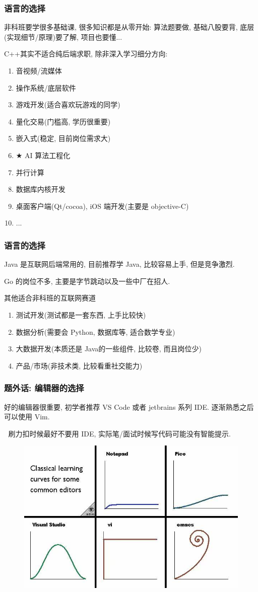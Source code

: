 \documentclass{ctexbeamer}
\begin{document}
\begin{frame}
	\frametitle{语言的选择}

	非科班要学很多基础课, 很多知识都是从零开始: 算法题要做, 基础八股要背, 底层(实现细节/原理)要了解, 项目也要懂...

	C++其实不适合纯后端求职, 除非深入学习细分方向:
	\begin{enumerate}
		\item 音视频/流媒体
		\item 操作系统/底层软件
		\item 游戏开发(适合喜欢玩游戏的同学)
		\item 量化交易(门槛高, 学历很重要)
		\item 嵌入式(稳定, 目前岗位需求大)
		\item $\bigstar$ AI 算法工程化
		\item 并行计算
		\item 数据库内核开发
		\item 桌面客户端(Qt/cocoa), iOS 端开发(主要是 objective-C)
		\item ...
	\end{enumerate}
\end{frame}
\begin{frame}
	\frametitle{语言的选择}
	Java 是互联网后端常用的, 目前推荐学 Java, 比较容易上手, 但是竞争激烈.

	Go 的岗位不多, 主要是字节跳动以及一些中厂在招人.

	\begin{exampleblock}{其他适合非科班的互联网赛道}
		\begin{enumerate}
			\item 测试开发(测试都是一套东西, 上手比较快)
			\item 数据分析(需要会 Python, 数据库等, 适合数学专业)
			\item 大数据开发(本质还是 Java的一些组件, 比较卷, 而且岗位少)
			\item 产品/市场(非技术类, 比较看重社交能力)
		\end{enumerate}
	\end{exampleblock}
\end{frame}

\begin{frame}
	\frametitle{题外话:  编辑器的选择}
	好的编辑器很重要, 初学者推荐 VS Code 或者 jetbrains 系列 IDE.
	逐渐熟悉之后可以使用 Vim.

	\begin{alertblock}{📢}
		刷力扣时候最好不要用 IDE, 实际笔/面试时候写代码可能没有智能提示.
	\end{alertblock}
	\begin{figure}[H]
		\centering
		\includegraphics[width=.55\textwidth]{figures/editor.jpg}
	\end{figure}
\end{frame}
\end{document}
